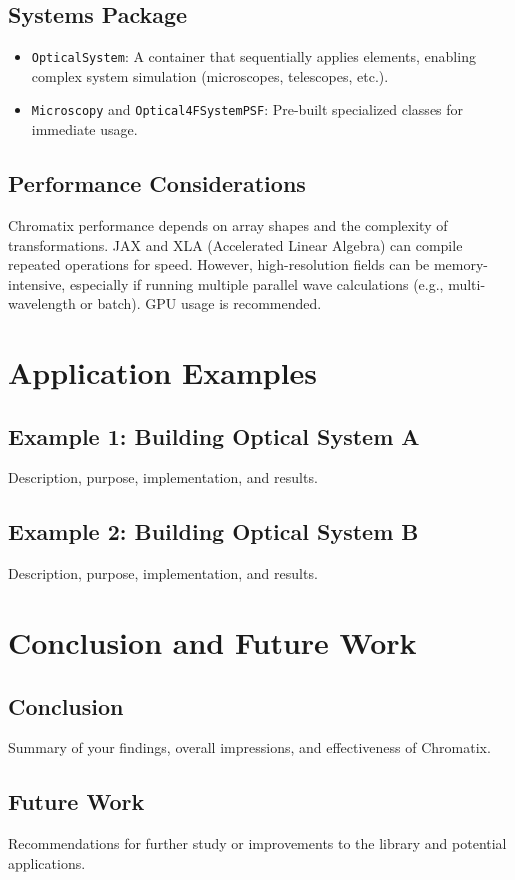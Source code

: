 \documentclass[a4paper,12pt]{report}
\begin{document}
\section{Systems Package}
\begin{itemize}
    \item \texttt{OpticalSystem}: A container that sequentially applies elements, enabling complex system simulation (microscopes, telescopes, etc.).
    \item \texttt{Microscopy} and \texttt{Optical4FSystemPSF}: Pre-built specialized classes for immediate usage.
\end{itemize}

\section{Performance Considerations}
Chromatix performance depends on array shapes and the complexity of transformations. JAX and XLA (Accelerated Linear Algebra) can compile repeated operations for speed. However, high-resolution fields can be memory-intensive, especially if running multiple parallel wave calculations (e.g., multi-wavelength or batch). GPU usage is recommended.

\chapter{Application Examples}
\section{Example 1: Building Optical System A}
Description, purpose, implementation, and results.

\section{Example 2: Building Optical System B}
Description, purpose, implementation, and results.

\chapter{Conclusion and Future Work}
\section{Conclusion}
Summary of your findings, overall impressions, and effectiveness of Chromatix.

\section{Future Work}
Recommendations for further study or improvements to the library and potential applications.
\end{document}
